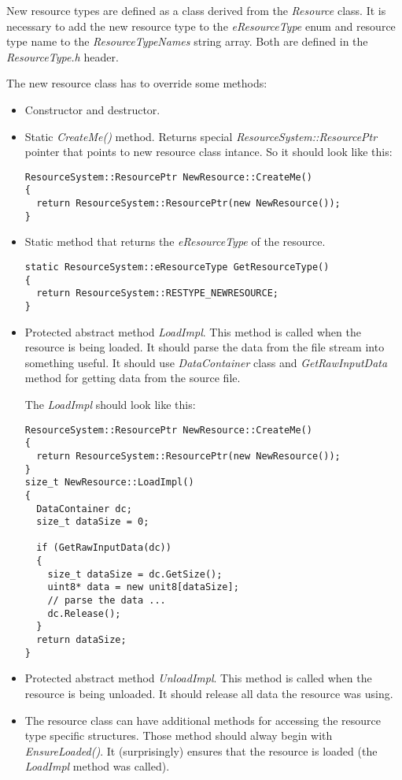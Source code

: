 \documentclass[a4paper, 12pt]{report}
\begin{document}
New resource types are defined as a class derived from the \emph{Resource} class. It is necessary to add the new resource type to the \emph{eResourceType} enum and resource type name to the \emph{ResourceTypeNames} string array. Both are defined in the \emph{ResourceType.h} header.

The new resource class has to override some methods:

\begin{itemize}
\item
Constructor and destructor.
\item
Static \emph{CreateMe()} method. Returns special \emph{ResourceSystem::ResourcePtr} pointer that points to new resource class intance. So it should look like this:

\begin{verbatim}
ResourceSystem::ResourcePtr NewResource::CreateMe()
{
  return ResourceSystem::ResourcePtr(new NewResource());
}
\end{verbatim}

\item
Static method that returns the \emph{eResourceType} of the resource.

\begin{verbatim}
static ResourceSystem::eResourceType GetResourceType() 
{ 
  return ResourceSystem::RESTYPE_NEWRESOURCE; 
}
\end{verbatim}

\item
Protected abstract method \emph{LoadImpl}. This method is called when the resource is being loaded. It should parse the data from the file stream into something useful. It should use \emph{DataContainer} class and \emph{GetRawInputData} method for getting data from the source file.

The \emph{LoadImpl} should look like this:

\begin{verbatim}
ResourceSystem::ResourcePtr NewResource::CreateMe()
{
  return ResourceSystem::ResourcePtr(new NewResource());
}
size_t NewResource::LoadImpl()
{
  DataContainer dc;
  size_t dataSize = 0;

  if (GetRawInputData(dc))
  {
    size_t dataSize = dc.GetSize();
    uint8* data = new unit8[dataSize];
    // parse the data ...
    dc.Release();
  }
  return dataSize;
}
\end{verbatim}

\item
Protected abstract method \emph{UnloadImpl}. This method is called when the resource is being unloaded. It should release all data the resource was using.

\item
The resource class can have additional methods for accessing the resource type specific structures. Those method should alway begin with \emph{EnsureLoaded()}. It (surprisingly) ensures that the resource is loaded (the \emph{LoadImpl} method was called).

\end{itemize}
\end{document}
